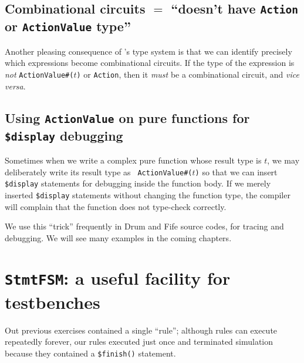 
\subsection{Combinational circuits $=$ ``doesn't have {\tt Action} or {\tt ActionValue} type''}


Another pleasing consequence of {\BSV}'s type system is that we can
identify precisely which expressions become combinational circuits.
If the type of the expression is \emph{not} {\tt ActionValue\#($t$)}
or {\tt Action}, then it \emph{must} be a combinational circuit, and
\emph{vice versa}.


\subsection{Using {\tt ActionValue} on pure functions for {\tt \$display} debugging}

Sometimes when we write a complex pure function whose result type is
$t$, we may deliberately write its result type as {\tt
ActionValue\#($t$)} so that we can insert \verb|$display| statements
for debugging inside the function body.  If we merely inserted
\verb|$display| statements without changing the function type, the
compiler will complain that the function does not type-check
correctly.

We use this ``trick'' frequently in Drum and Fife source codes, for
tracing and debugging.  We will see many examples in the coming
chapters.


\section{{\tt StmtFSM}: a useful facility for testbenches}

\label{BSV_small_testbench}


Out previous exercises contained a single ``rule''; although rules can
execute repeatedly forever, our rules executed just once and
terminated simulation because they contained a \verb|$finish()|
statement.

